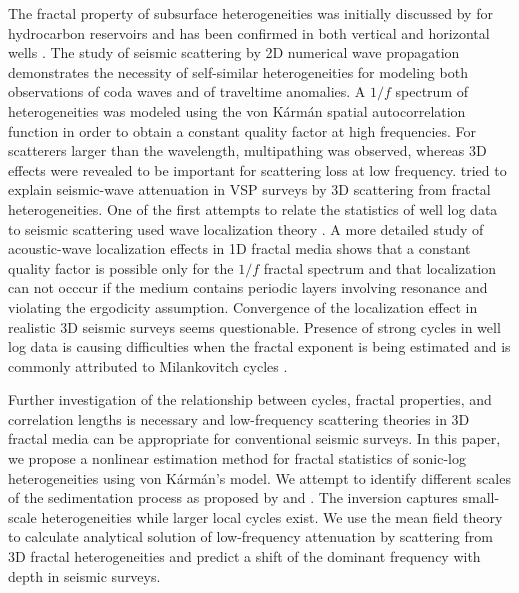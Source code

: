 The fractal property of subsurface heterogeneities was initially discussed by \cite{Hewett_86} 
for hydrocarbon reservoirs and has been confirmed in both vertical and horizontal wells \cite[]{Stefani_G01}.
The study of seismic scattering by 2D numerical wave propagation \cite[]{Frankel_C86} 
demonstrates the necessity of self-similar heterogeneities for modeling
both observations of coda waves and of traveltime anomalies.
A $1/f$ spectrum of heterogeneities was modeled 
using the von K\'arm\'an spatial autocorrelation function \cite[]{Vonkarman_48}
in order to obtain a constant quality factor at high frequencies.
For scatterers larger than the wavelength, multipathing was observed, whereas
3D effects were revealed to be important for scattering loss at low frequency.
\cite{Gist_94} tried to explain seismic-wave attenuation in VSP surveys 
by 3D scattering from fractal heterogeneities.
One of the first attempts to relate the statistics of well log data 
to seismic scattering used wave localization theory \cite[]{White_SN90}.
A more detailed study of acoustic-wave localization effects in 1D fractal media \cite[]{Vanderbaan_01}
shows that a constant quality factor is possible only for the $1/f$ fractal spectrum
and that localization can not occcur if the medium contains periodic layers involving resonance
and violating the ergodicity assumption.
Convergence of the localization effect in realistic 3D seismic surveys seems questionable.
Presence of strong cycles in well log data is causing difficulties 
when the fractal exponent is being estimated \cite[]{Dolan_BR98}
and is commonly attributed to Milankovitch cycles \cite[]{Anstey_D02a}.

Further investigation of the relationship between cycles, fractal
properties, and correlation lengths is necessary and low-frequency
scattering theories in 3D fractal media can be appropriate for
conventional seismic surveys.  In this paper, we propose a nonlinear
estimation method for fractal statistics of sonic-log heterogeneities
using von K\'arm\'an's model.  We attempt to identify different scales
of the sedimentation process as proposed by \cite{Odoherty_A71} and
\cite{Anstey_D02a}.  The inversion captures small-scale
heterogeneities while larger local cycles exist.  We use the mean
field theory to calculate analytical solution of low-frequency
attenuation by scattering from 3D fractal heterogeneities and predict
a shift of the dominant frequency with depth in seismic surveys.

